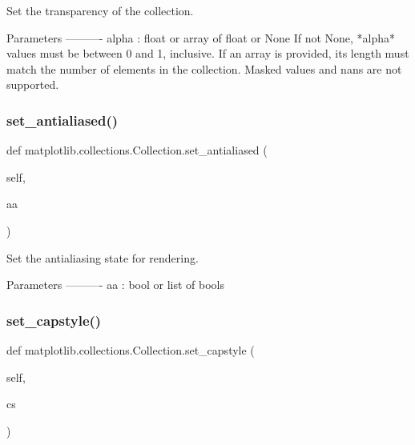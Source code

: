 \begin{DoxyVerb}Set the transparency of the collection.

Parameters
----------
alpha : float or array of float or None
    If not None, *alpha* values must be between 0 and 1, inclusive.
    If an array is provided, its length must match the number of
    elements in the collection.  Masked values and nans are not
    supported.
\end{DoxyVerb}
 \mbox{\label{classmatplotlib_1_1collections_1_1Collection_a3c581a16ef2582704f8653e27a6f3065}} 
\subsubsection{\texorpdfstring{set\+\_\+antialiased()}{set\_antialiased()}}
{\footnotesize\ttfamily def matplotlib.\+collections.\+Collection.\+set\+\_\+antialiased (\begin{DoxyParamCaption}\item[{}]{self,  }\item[{}]{aa }\end{DoxyParamCaption})}

\begin{DoxyVerb}Set the antialiasing state for rendering.

Parameters
----------
aa : bool or list of bools
\end{DoxyVerb}
 \mbox{\label{classmatplotlib_1_1collections_1_1Collection_ad0a6677dac2573501580150f22c8d12d}} 
\subsubsection{\texorpdfstring{set\+\_\+capstyle()}{set\_capstyle()}}
{\footnotesize\ttfamily def matplotlib.\+collections.\+Collection.\+set\+\_\+capstyle (\begin{DoxyParamCaption}\item[{}]{self,  }\item[{}]{cs }\end{DoxyParamCaption})}

